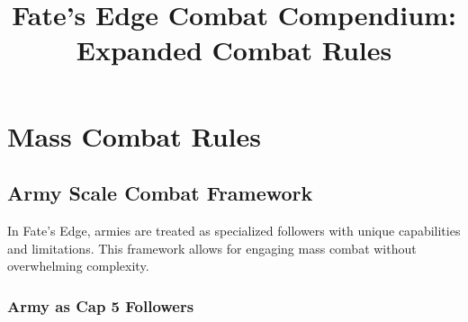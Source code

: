 \documentclass[11pt,letterpaper]{article}
\title{Fate's Edge Combat Compendium: Expanded Combat Rules}
\author{}
\date{}
\begin{document}
\maketitle

\tableofcontents
\newpage

\section{Mass Combat Rules}

\subsection{Army Scale Combat Framework}

In Fate's Edge, armies are treated as specialized followers with unique capabilities and limitations. This framework allows for engaging mass combat without overwhelming complexity.

\subsubsection{Army as Cap 5 Followers}
\end{document}
